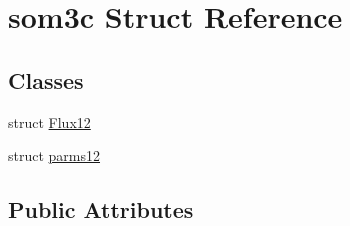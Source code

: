 \hypertarget{structsom3c}{\section{som3c Struct Reference}
\label{structsom3c}
}
\subsection*{Classes}
\begin{DoxyCompactItemize}
\item 
struct \hyperlink{structsom3c_1_1_flux12}{Flux12}
\item 
struct \hyperlink{structsom3c_1_1parms12}{parms12}
\end{DoxyCompactItemize}
\subsection*{Public Attributes}
